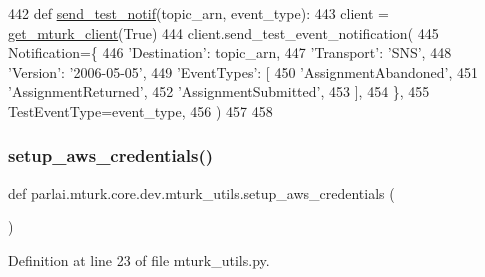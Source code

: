 \begin{DoxyCode}
442 \textcolor{keyword}{def }\hyperlink{namespaceparlai_1_1mturk_1_1core_1_1mturk__utils_a03b8f25675cb76e8b27205ca5d26e623}{send\_test\_notif}(topic\_arn, event\_type):
443     client = \hyperlink{namespaceparlai_1_1mturk_1_1core_1_1mturk__utils_a577e2527c04682284394b0951a090695}{get\_mturk\_client}(\textcolor{keyword}{True})
444     client.send\_test\_event\_notification(
445         Notification=\{
446             \textcolor{stringliteral}{'Destination'}: topic\_arn,
447             \textcolor{stringliteral}{'Transport'}: \textcolor{stringliteral}{'SNS'},
448             \textcolor{stringliteral}{'Version'}: \textcolor{stringliteral}{'2006-05-05'},
449             \textcolor{stringliteral}{'EventTypes'}: [
450                 \textcolor{stringliteral}{'AssignmentAbandoned'},
451                 \textcolor{stringliteral}{'AssignmentReturned'},
452                 \textcolor{stringliteral}{'AssignmentSubmitted'},
453             ],
454         \},
455         TestEventType=event\_type,
456     )
457 
458 
\end{DoxyCode}
\mbox{\label{namespaceparlai_1_1mturk_1_1core_1_1dev_1_1mturk__utils_a086d7381c328214587d3ec28bbcd19ab}} 
\subsubsection{\texorpdfstring{setup\+\_\+aws\+\_\+credentials()}{setup\_aws\_credentials()}}
{\footnotesize\ttfamily def parlai.\+mturk.\+core.\+dev.\+mturk\+\_\+utils.\+setup\+\_\+aws\+\_\+credentials (\begin{DoxyParamCaption}{ }\end{DoxyParamCaption})}



Definition at line 23 of file mturk\+\_\+utils.\+py.


